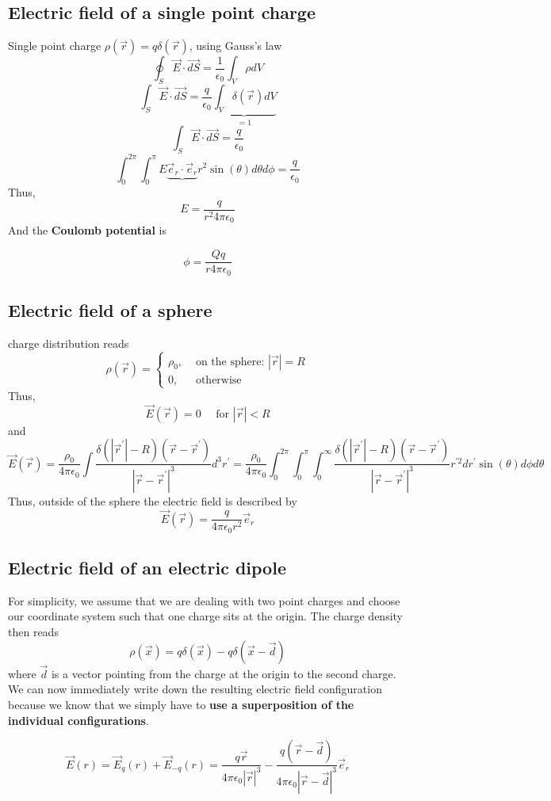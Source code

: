\subsection{Electric field of a single point charge}
Single point charge $\rho(\vec{r})=q \delta(\vec{r})$, using Gauss's law
$$
\oint_{S} \vec{E} \cdot \overrightarrow{d S}=\frac{1}{\epsilon_{0}} \int_{V} \rho d V
$$
$$
\int_{S} \vec{E} \cdot \overrightarrow{d S}=\frac{q}{\epsilon_{0}} \underbrace{\int_{V} \delta(\vec{r}) d V}_{=1}
$$
$$
\int_{S} \vec{E} \cdot \overrightarrow{d S}=\frac{q}{\epsilon_{0}}
$$
$$
\int_{0}^{2 \pi} \int_{0}^{\pi} E \underbrace{\vec{e}_{r} \cdot \vec{e}_{r}} r^{2} \sin (\theta) d \theta d \phi=\frac{q}{\epsilon_{0}}
$$
Thus,
$$
E=\frac{q}{r^{2} 4 \pi \epsilon_{0}}
$$
And the \textbf{Coulomb potential} is 
\begin{qt}
\begin{equation}
\phi=\frac{Q q}{r 4 \pi \epsilon_{0}}
\label{coulombPotential}
\end{equation}
\end{qt}
\subsection{Electric field of a sphere}
charge distribution reads
$$
\rho(\vec{r})=\left\{\begin{array}{ll}
{\rho_{0},} & {\text { on the sphere: }|\vec{r}|=R} \\
{0,} & {\text { otherwise }}
\end{array}\right.
$$
Thus,
$$
\vec{E}(\vec{r})=0 \quad \text { for }|\vec{r}|<R
$$
and
$$
\vec{E}(\vec{r})=\frac{\rho_{0}}{4 \pi \epsilon_{0}} \int \frac{\delta\left(\left|\vec{r}^{\prime}\right|-R\right)\left(\vec{r}-\vec{r}^{\prime}\right)}{\left|\vec{r}-\vec{r}^{\prime}\right|^{3}} d^{3} r^{\prime}=\frac{\rho_{0}}{4 \pi \epsilon_{0}} \int_{0}^{2 \pi} \int_{0}^{\pi} \int_{0}^{\infty} \frac{\delta\left(\left|\vec{r}^{\prime}\right|-R\right)\left(\vec{r}-\vec{r}^{\prime}\right)}{\left|\vec{r}-\vec{r}^{\prime}\right|^{3}} r^{\prime 2} d r^{\prime} \sin (\theta) d \phi d \theta
$$
Thus, outside of the sphere the electric field is described by
$$
\vec{E}(\vec{r})=\frac{q}{4 \pi \epsilon_{0} r^{2}} \vec{e}_{r}
$$
\subsection{Electric field of an electric dipole}
For simplicity, we assume that we are dealing with two point charges and choose our coordinate system such that one charge sits at the origin. The charge density then reads
$$
\rho(\vec{x})=q \delta(\vec{x})-q \delta(\vec{x}-\vec{d})
$$
where $\vec{d}$ is a vector pointing from the charge at the origin to the second charge. We can now immediately write down the resulting electric field configuration because we know that we simply have to \textbf{use a superposition of the individual configurations}.
\begin{qt}
\begin{equation}
\vec{E}(r)=\vec{E}_{q}(r)+\vec{E}_{-q}(r)=\frac{q \vec{r}}{4 \pi \epsilon_{0}|\vec{r}|^{3}}-\frac{q(\vec{r}-\vec{d})}{4 \pi \epsilon_{0}|\vec{r}-\vec{d}|^{3}} \vec{e}_{r}
\end{equation}
\end{qt}
